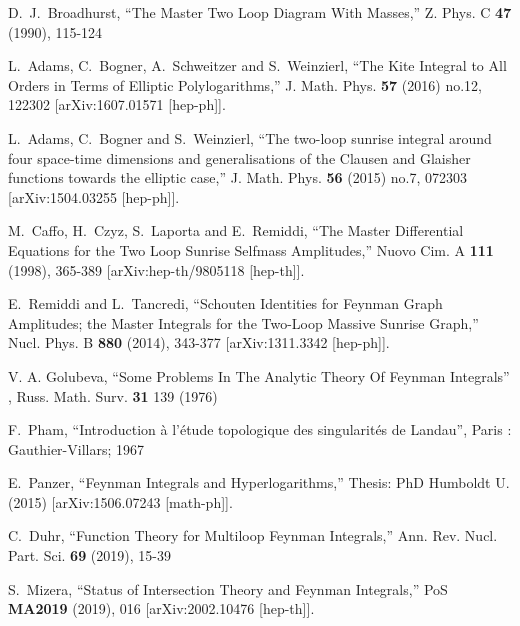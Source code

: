 \documentclass[a4paper,12pt]{article}
\numberwithin{equation}{section}
\numberwithin{figure}{section}
\begin{document}
\begin{thebibliography}{99}

D.~J.~Broadhurst,
``The Master Two Loop Diagram With Masses,''
Z. Phys. C \textbf{47} (1990), 115-124
  
L.~Adams, C.~Bogner, A.~Schweitzer and S.~Weinzierl,
``The Kite Integral to All Orders in Terms of Elliptic Polylogarithms,''
J. Math. Phys. \textbf{57} (2016) no.12, 122302
[arXiv:1607.01571 [hep-ph]].
  
L.~Adams, C.~Bogner and S.~Weinzierl,
``The two-loop sunrise integral around four space-time dimensions and generalisations of the Clausen and Glaisher functions towards the elliptic case,''
J. Math. Phys. \textbf{56} (2015) no.7, 072303
[arXiv:1504.03255 [hep-ph]].
  
M.~Caffo, H.~Czyz, S.~Laporta and E.~Remiddi,
``The Master Differential Equations for the Two Loop Sunrise Selfmass Amplitudes,''
Nuovo Cim. A \textbf{111} (1998), 365-389
[arXiv:hep-th/9805118 [hep-th]].
  
E.~Remiddi and L.~Tancredi,
``Schouten Identities for Feynman Graph Amplitudes; the Master Integrals for the Two-Loop Massive Sunrise Graph,''
Nucl. Phys. B \textbf{880} (2014), 343-377
[arXiv:1311.3342 [hep-ph]].
  
 V. A. Golubeva, ``Some Problems In The Analytic
  Theory Of Feynman Integrals'' , Russ. Math. Surv. {\bf 31} 139 (1976)

 F.~Pham, ``Introduction \`a l'\'etude topologique des
  singularit\'es de Landau'', Paris : Gauthier-Villars; 1967

E.~Panzer,
``Feynman Integrals and Hyperlogarithms,''
Thesis: PhD Humboldt U. (2015)
[arXiv:1506.07243 [math-ph]].

C.~Duhr,
``Function Theory for Multiloop Feynman Integrals,''
Ann. Rev. Nucl. Part. Sci. \textbf{69} (2019), 15-39



  
S.~Mizera,
``Status of Intersection Theory and Feynman Integrals,''
PoS \textbf{MA2019} (2019), 016
[arXiv:2002.10476 [hep-th]].


\end{thebibliography}
\end{document}
